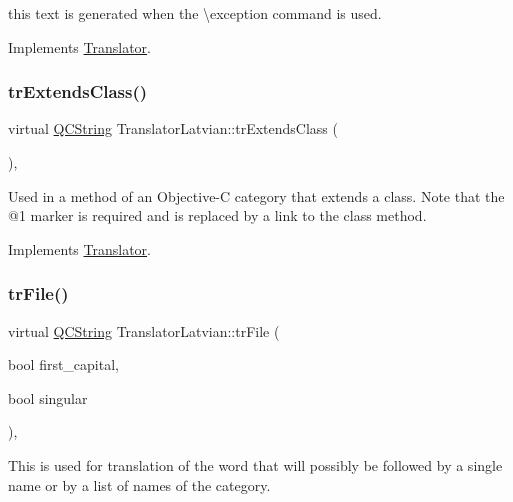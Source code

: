 this text is generated when the \textbackslash{}exception command is used. 

Implements \mbox{\hyperlink{class_translator}{Translator}}.

\mbox{\label{class_translator_latvian_a92ae08c24e206607521d096c932e3953}} 
\subsubsection{\texorpdfstring{trExtendsClass()}{trExtendsClass()}}
{\footnotesize\ttfamily virtual \mbox{\hyperlink{class_q_c_string}{Q\+C\+String}} Translator\+Latvian\+::tr\+Extends\+Class (\begin{DoxyParamCaption}{ }\end{DoxyParamCaption})\hspace{0.3cm}{\ttfamily [inline]}, {\ttfamily [virtual]}}

Used in a method of an Objective-\/C category that extends a class. Note that the @1 marker is required and is replaced by a link to the class method. 

Implements \mbox{\hyperlink{class_translator}{Translator}}.

\mbox{\label{class_translator_latvian_aa634d033192560ad81e4400dcf2cc6c7}} 
\subsubsection{\texorpdfstring{trFile()}{trFile()}}
{\footnotesize\ttfamily virtual \mbox{\hyperlink{class_q_c_string}{Q\+C\+String}} Translator\+Latvian\+::tr\+File (\begin{DoxyParamCaption}\item[{bool}]{first\+\_\+capital,  }\item[{bool}]{singular }\end{DoxyParamCaption})\hspace{0.3cm}{\ttfamily [inline]}, {\ttfamily [virtual]}}

This is used for translation of the word that will possibly be followed by a single name or by a list of names of the category. 

